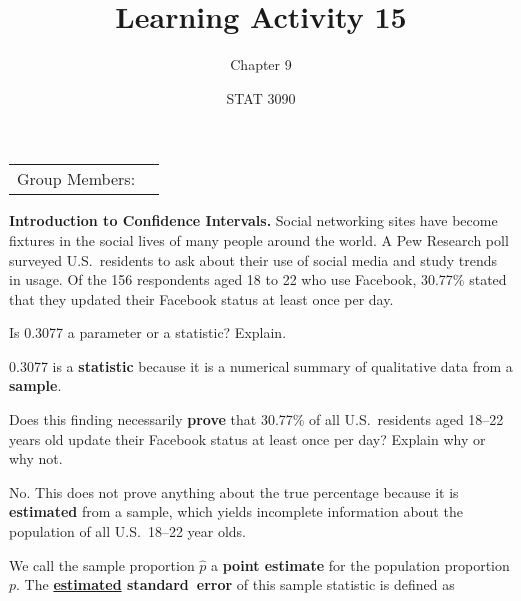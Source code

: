 \documentclass[noanswers]{exam}
\title{Learning Activity 15}
\author{Chapter 9}
\date{STAT 3090}
\begin{document}
\noindent\begin{tabular}{@{}p{1.05in}p{5.5in}@{}}
Group Members: & \hrulefill
\end{tabular}

\vspace{3mm}

\noindent \textbf{Introduction to Confidence Intervals. }Social networking sites have become fixtures in the social lives of many people around the world. A Pew Research poll surveyed U.S.\ residents to ask about their use of social media and study trends in usage. Of the 156 respondents aged 18 to 22 who use Facebook, 30.77\% stated that they updated their Facebook status at least once per day.

\vspace{3mm}

\begin{questions}
		
	\question Is 0.3077 a parameter or a statistic? Explain.
		
	\begin{solution}[\stretch{1}]
	
	\vspace{1mm}

	0.3077 is a \textbf{statistic} because it is a numerical summary of qualitative data from a \textbf{sample}.
	
	\vspace{1mm}

	\end{solution}	
	
	\question Does this finding necessarily \textbf{prove} that 30.77\% of all U.S.\ residents aged 18--22 years old update their Facebook status at least once per day? Explain why or why not.
	
	\begin{solution}[\stretch{1}]
	
	\vspace{1mm}

	No. This does not prove anything about the true percentage because it is \textbf{estimated} from a sample, which yields incomplete information about the population of all U.S.\ 18--22 year olds.
	
	\vspace{1mm}

	\end{solution}	
		
	\question We call the sample proportion $\hat{p}$ a \textbf{point estimate} for the population proportion $p$. The \textbf{\underline{estimated} \mbox{standard error}} of this sample statistic is defined as 


\end{questions}
\end{document}
